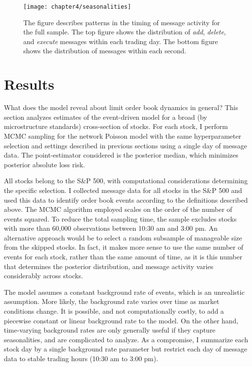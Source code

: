 	\begin{figure}[t]
	\small
	\linespread{1}
	\centering
	\texttt{[image: chapter4/seasonalities]}
	\captionsetup{skip=-20pt, labelsep=colon, font=footnotesize, width=\linewidth, justification=justified}
	\caption[Message activity seasonalities]{The figure describes patterns in the timing of message activity for the full sample. The top figure shows the distribution of \textit{add}, \textit{delete}, and \textit{execute} messages within each trading day. The bottom figure shows the distribution of messages within each second.}
	\label{fig:seasonalities}
	\end{figure}


\section{Results}
	What does the model reveal about limit order book dynamics in general? This section analyzes estimates of the event-driven model for a broad (by microstructure standards) cross-section of stocks. For each stock, I perform MCMC sampling for the network Poisson model with the same hyperparameter selection and settings described in previous sections using a single day of message data. The point-estimator considered is the posterior median, which minimizes posterior absolute loss risk.

	All stocks belong to the S\&P 500, with computational considerations determining the specific selection. I collected message data for all stocks in the S\&P 500 and used this data to identify order book events according to the definitions described above. The MCMC algorithm employed scales on the order of the number of events squared. To reduce the total sampling time, the sample excludes stocks with more than 60,000 observations between 10:30 am and 3:00 pm. An alternative approach would be to select a random subsample of manageable size from the skipped stocks. In fact, it makes more sense to use the same number of events for each stock, rather than the same amount of time, as it is this number that determines the posterior distribution, and message activity varies considerably across stocks.

	The model assumes a constant background rate of events, which is an unrealistic assumption. More likely, the background rate varies over time as market conditions change. It is possible, and not computationally costly, to add a piecewise constant or linear background rate to the model. On the other hand, time-varying background rates are only generally useful if they capture seasonalities, and are complicated to analyze. As a compromise, I summarize each stock day by a single background rate parameter but restrict each day of message data to stable trading hours (10:30 am to 3:00 pm).

